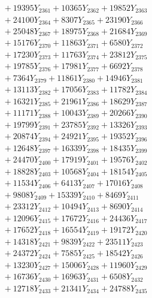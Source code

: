 \documentclass[a4paper,10pt]{article}
\begin{document}
{\begin{align}
&\;  + 19395 Y_{2361} + 10365 Y_{2362} + 19852 Y_{2363} \\[0.3ex]
&\;  + 24100 Y_{2364} + 8307 Y_{2365} + 23190 Y_{2366} \\[0.3ex]
&\;  + 25048 Y_{2367} + 18975 Y_{2368} + 21684 Y_{2369} \\[0.5ex]\allowbreak
&\;  + 15176 Y_{2370} + 11863 Y_{2371} + 6580 Y_{2372} \\[0.3ex]
&\;  + 17230 Y_{2373} + 11763 Y_{2374} + 23812 Y_{2375} \\[0.3ex]
&\;  + 19785 Y_{2376} + 17981 Y_{2377} + 6692 Y_{2378} \\[0.3ex]
&\;  + 7364 Y_{2379} + 11861 Y_{2380} + 14946 Y_{2381} \\[0.3ex]
&\;  + 13113 Y_{2382} + 17056 Y_{2383} + 11782 Y_{2384} \\[0.3ex]
&\;  + 16321 Y_{2385} + 21961 Y_{2386} + 18629 Y_{2387} \\[0.3ex]
&\;  + 11171 Y_{2388} + 10043 Y_{2389} + 20266 Y_{2390} \\[0.3ex]
&\;  + 19799 Y_{2391} + 23785 Y_{2392} + 13326 Y_{2393} \\[0.3ex]
&\;  + 20874 Y_{2394} + 24921 Y_{2395} + 19352 Y_{2396} \\[0.3ex]
&\;  + 12648 Y_{2397} + 16339 Y_{2398} + 18435 Y_{2399} \\[0.5ex]\allowbreak
&\;  + 24470 Y_{2400} + 17919 Y_{2401} + 19576 Y_{2402} \\[0.3ex]
&\;  + 18828 Y_{2403} + 10568 Y_{2404} + 18154 Y_{2405} \\[0.3ex]
&\;  + 11534 Y_{2406} + 6413 Y_{2407} + 17016 Y_{2408} \\[0.3ex]
&\;  + 9808 Y_{2409} + 15339 Y_{2410} + 8469 Y_{2411} \\[0.3ex]
&\;  + 23312 Y_{2412} + 10494 Y_{2413} + 8690 Y_{2414} \\[0.3ex]
&\;  + 12096 Y_{2415} + 17672 Y_{2416} + 24436 Y_{2417} \\[0.3ex]
&\;  + 17652 Y_{2418} + 16554 Y_{2419} + 19172 Y_{2420} \\[0.3ex]
&\;  + 14318 Y_{2421} + 9839 Y_{2422} + 23511 Y_{2423} \\[0.3ex]
&\;  + 24372 Y_{2424} + 7585 Y_{2425} + 18542 Y_{2426} \\[0.3ex]
&\;  + 13230 Y_{2427} + 15006 Y_{2428} + 11960 Y_{2429} \\[0.5ex]\allowbreak
&\;  + 16736 Y_{2430} + 16963 Y_{2431} + 6508 Y_{2432} \\[0.3ex]
&\;  + 12718 Y_{2433} + 21341 Y_{2434} + 24788 Y_{2435} \\[0.3ex]

\end{align}}
\end{document}
